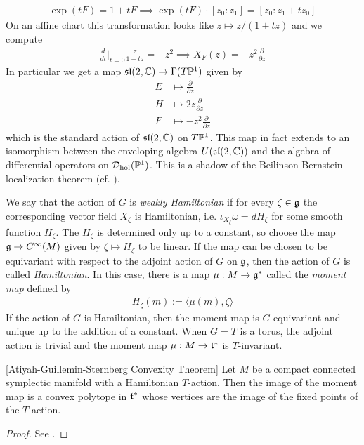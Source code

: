 \begin{example}
\begin{align*}
        \exp(tF) = 1 + tF \implies \exp(tF)\cdot [z_0:z_1] = [z_0 : z_1 + tz_0]
    \end{align*} On an affine chart this transformation looks like $z\mapsto z/(1+tz)$
    and we compute \begin{align*}
        \frac{d}{dt}\Big|_{t=0} \frac{z}{1+tz} = -z^2 \implies X_F(z) = -z^2\frac{\partial}{\partial z}
    \end{align*} In particular we get a map $\mf{sl}(2,\C) \to \Gamma(T\P^1)$ given by
    \begin{align*}
        E &\mapsto \frac{\partial}{\partial z} \\
        H &\mapsto 2z\frac{\partial}{\partial z} \\
        F &\mapsto -z^2\frac{\partial}{\partial z}
    \end{align*} which is the standard action of $\mf{sl}(2,\C)$ on $T\P^1$. This map in fact 
    extends to an isomorphism between the enveloping algebra $U(\mf{sl}(2,\C))$ and 
    the algebra of differential operators on $\cD_{\text{hol}}(\P^1)$. This is a 
    shadow of the Beilinson-Bernstein localization theorem (cf. \cite{htt}).
\end{example}

We say that the
action of $G$ is \emph{weakly Hamiltonian} 
if for every $\zeta\in\mf g$ the corresponding vector field $X_\zeta$ is Hamiltonian,
i.e. $\iota_{X_\zeta}\omega = dH_\zeta$ for some smooth function $H_\zeta$. The $H_\zeta$
is determined only up to a constant, so choose the map $\mf g \to C^\infty(M)$ given by 
$\zeta \mapsto H_\zeta$ to be linear. If the map can be chosen to be equivariant with respect
to the adjoint action of $G$ on $\mf g$, then the action of $G$ is called \emph{Hamiltonian}.
In this case, there is a map $\mu : M \to \mf g^*$ called the \emph{moment map} defined by
\begin{align*}
    H_\zeta(m) := \langle \mu(m), \zeta \rangle
\end{align*}
If the action of $G$ is Hamiltonian, then the moment map is $G$-equivariant and unique up 
to the addition of a constant. When $G = T$ is a torus, the adjoint action 
is trivial and the moment map $\mu : M \to \mf t^*$
is $T$-invariant.

\begin{theorem}\label{thm:ags}
    [Atiyah-Guillemin-Sternberg Convexity Theorem] Let $M$ be a compact connected symplectic manifold with a
    Hamiltonian $T$-action. Then the image of the moment map is a convex polytope 
    in $\mf t^*$ whose vertices are the image of the fixed points of the $T$-action.
\end{theorem}
\begin{proof}
    See \cite{mcduff-salamon}.
\end{proof}

